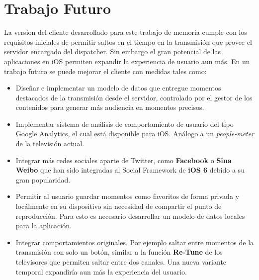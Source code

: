 	\section{Trabajo Futuro}
La version del cliente desarrollado para este trabajo de memoria cumple con los requisitos iniciales de permitir saltos en el tiempo en la transmisión que provee el servidor encargado del dispatcher. Sin embargo el gran potencial de las aplicaciones en iOS permiten expandir la experiencia de usuario aun más. En un trabajo futuro se puede mejorar el cliente con medidas tales como:
\begin{itemize}
\item Diseñar e implementar un modelo de datos que entregue momentos destacados de la transmisión desde el servidor, controlado por el gestor de los contenidos para generar más audiencia en momentos precisos.

\item Implementar sistema de análisis de comportamiento de usuario del tipo Google Analytics, el cual está disponible para iOS. Análogo a un \textit{people-meter} de la televisión actual.

\item Integrar más redes sociales aparte de Twitter, como \textbf{Facebook} o \textbf{Sina Weibo} que han sido integradas al Social Framework de \textbf{iOS 6} debido a su gran popularidad.

\item Permitir al usuario guardar momentos como favoritos de forma privada y locálmente en su dispositivo sin necesidad de compartir el punto de reproducción. Para esto es necesario desarrollar un modelo de datos locales para la aplicación.

\item Integrar comportamientos originales. Por ejemplo saltar entre momentos de la transmisión con solo un botón, similar a la función \textbf{Re-Tune} de los televisores que permiten saltar entre dos canales. Una nueva variante temporal expandiría aun más la experiencia del usuario.
\end{itemize}

	
